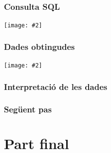 \documentclass[a4paper,12pt]{article}
\newcommand{\mygraphic}[2][width=\textwidth]{\begin{center}
		\centering\texttt{[image: \#2]}\par
\end{center}}
\begin{document}
\subsubsection{Consulta SQL}
\mygraphic{imatges/11.png}

\subsubsection{Dades obtingudes}
\mygraphic{imatges/12.png}

\subsubsection{Interpretació de les dades}

\subsubsection{Següent pas}

\newpage
\section{Part final}
\end{document}
